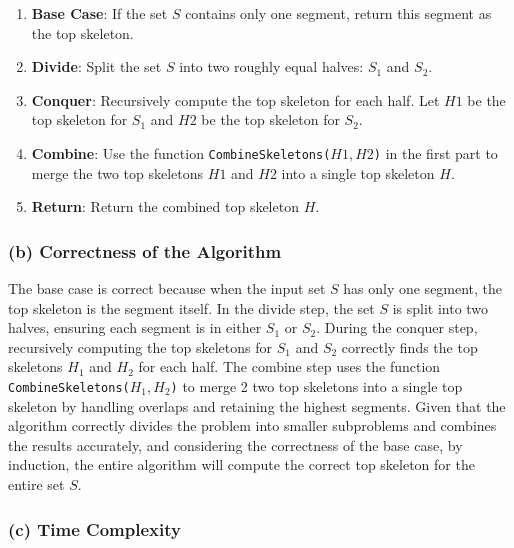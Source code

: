 \documentclass[12pt]{article}
\begin{document}
        \begin{enumerate}
            \item \textbf{Base Case}:
            If the set \( S \) contains only one segment, return this segment as the top skeleton.
           
            \item \textbf{Divide}:
            Split the set \( S \) into two roughly equal halves: \( S_1 \) and \( S_2 \).
           
            \item \textbf{Conquer}:
            Recursively compute the top skeleton for each half. Let \( H1 \) be the top skeleton for \( S_1 \) and \( H2 \) be the top skeleton for \( S_2 \).
           
            \item \textbf{Combine}:
            Use the function \texttt{CombineSkeletons(\( H1, H2 \))} in the first part to merge the two top skeletons \( H1 \) and \( H2 \) into a single top skeleton \( H \).
           
            \item \textbf{Return}:
            Return the combined top skeleton \( H \).
        \end{enumerate}


        \subsubsection*{(b) Correctness of the Algorithm}

        The base case is correct because when the input set \( S \) has only one segment, the top skeleton is the segment itself. In the divide step, the set \( S \) is split into two halves, ensuring each segment is in either \( S_1 \) or \( S_2 \). During the conquer step, recursively computing the top skeletons for \( S_1 \) and \( S_2 \) correctly finds the top skeletons \( H_1 \) and \( H_2 \) for each half. The combine step uses the function \texttt{CombineSkeletons(\( H_1, H_2 \))} to merge 2 two top skeletons into a single top skeleton by handling overlaps and retaining the highest segments. Given that the algorithm correctly divides the problem into smaller subproblems and combines the results accurately, and considering the correctness of the base case, by induction, the entire algorithm will compute the correct top skeleton for the entire set \( S \).

        \subsubsection*{(c) Time Complexity}
\end{document}
